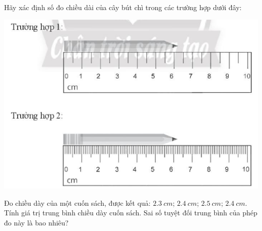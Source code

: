 \begin{ex}
	Hãy xác định số đo chiều dài của cây bút chì trong các trường hợp dưới đây:
	\begin{center}
		\includegraphics[scale=0.5]{figs/G10Y25B2-4}
	\end{center}
\end{ex}

\begin{ex}
	Đo chiều dày của một cuốn sách, được kết quả: $\SI{2.3}{cm}$; $\SI{2.4}{cm}$; $\SI{2.5}{cm}$; $\SI{2.4}{cm}$. Tính giá trị trung bình chiều dày cuốn sách. Sai số tuyệt đối trung bình của phép đo này là bao nhiêu?
\end{ex}

